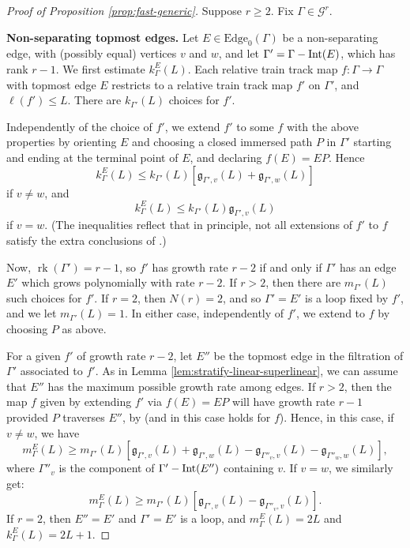 \documentclass[11pt,oneside]{amsart}
\newcounter{ax}
\theoremstyle{definition}
\DeclareMathOperator{\rank}{rk}
\newcommand{\interior} [1] {{\ensuremath \text{\rm Int}(#1) }}
\newcommand{\gate}{\mathfrak g}
\newcommand{\edges}{\mathrm{Edge}}
\begin{document}
\begin{proof}[Proof of Proposition \ref{prop:fast-generic}]
Suppose $r\geq 2$.  Fix $\Gamma\in\mathcal G^r$.  

\textbf{Non-separating topmost edges.}  Let $E\in\edges_0(\Gamma)$ be a non-separating edge, with (possibly equal) vertices $v$ and $w$, and let $\Gamma'=\Gamma-\interior{E}$, which has rank $r-1$.  We first estimate $k^E_\Gamma(L)$.  Each relative train track map $f:\Gamma\to\Gamma$ with topmost edge $E$ restricts to a relative train track map $f'$ on $\Gamma'$, and $\ell(f')\leq L$.  There are $k_{\Gamma'}(L)$ choices for $f'$.  

Independently of the choice of $f'$, we extend $f'$ to some $f$ with the above properties by orienting $E$ and choosing a closed immersed path $P$ in $\Gamma'$ starting and ending at the terminal point of $E$, and declaring $f(E)=EP$.  Hence
$$k^E_\Gamma(L)\leq k_{\Gamma'}(L)[\gate_{\Gamma',v}(L)+\gate_{\Gamma',w}(L)]$$
if $v\neq w$, and 
$$k^E_\Gamma(L)\leq k_{\Gamma'}(L)\gate_{\Gamma',v}(L)$$
if $v=w$.  (The inequalities reflect that in principle, not all extensions of $f'$ to $f$ satisfy the extra conclusions of \cite[Thm. 5.1.8]{BFH:tits-I}.)

Now, $\rank(\Gamma')=r-1$, so $f'$  has growth rate $r-2$ if and only if $\Gamma'$ has an edge $E'$ which grows polynomially with rate $r-2$.  If $r>2$, then there are $m_{\Gamma'}(L)$ such choices for $f'$.  If $r=2$, then $N(r)=2$, and so $\Gamma'=E'$ is a loop fixed by $f'$, and we let $m_{\Gamma'}(L)=1$.  In either case, independently of $f'$, we extend to $f$ by choosing $P$ as above.

For a given $f'$ of growth rate $r-2$, let $E''$ be the topmost edge in the filtration of $\Gamma'$ associated to $f'$.  As in Lemma \ref{lem:stratify-linear-superlinear}, we can assume that $E''$ has the maximum possible growth rate among edges.  If $r>2$, then the map $f$ given by extending $f'$ via $f(E)=EP$ will have growth rate $r-1$ provided $P$ traverses $E''$, by \cite[Lem. 2.16]{Macura:detour} (and in this case \cite[Thm. 1.1]{BFH:kolchin} holds for $f$).  Hence, in this case, if $v\neq w$, we have
$$m_\Gamma^E(L)\geq m_{\Gamma'}(L)[\gate_{\Gamma',v}(L)+\gate_{\Gamma',w}(L)-\gate_{\Gamma''_v,v}(L)-\gate_{\Gamma''_w,w}(L)],$$
where $\Gamma''_v$ is the component of $\Gamma'-\interior{E''}$ containing $v$.  If $v=w$, we similarly get:
$$m_\Gamma^E(L)\geq m_{\Gamma'}(L)[\gate_{\Gamma',v}(L)-\gate_{\Gamma''_v,v}(L)].$$
If $r=2$, then $E''=E'$ and $\Gamma'=E'$ is a loop, and $m_\Gamma^E(L)=2L$ and $k^E_\Gamma(L)=2L+1$.


\end{proof}
\end{document}
